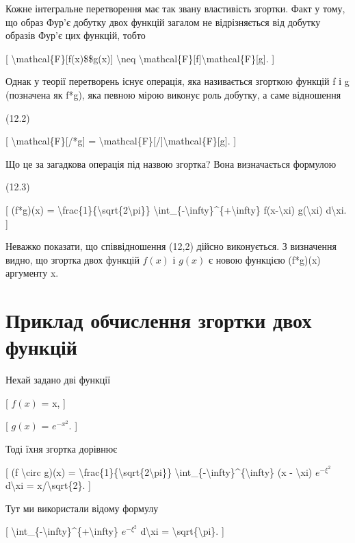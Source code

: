 \documentclass[
]{article}
\begin{document}
{{Кожне інтегральне перетворення має так звану властивість згортки. Факт у
тому, що образ Фур'є добутку двох функцій загалом не відрізняється від
добутку образів Фур'є цих функцій, тобто

{[} \textbackslash mathcal\{F\}{[}f(x)\$\$g(x){]} \textbackslash neq
\textbackslash mathcal\{F\}{[}f{]}\textbackslash mathcal\{F\}{[}g{]}.
{]}

Однак у теорії перетворень існує операція, яка називається згорткою
функцій f і g (позначена як f*g), яка певною мірою виконує роль добутку,
а саме відношення

(12.2)

{[} \textbackslash mathcal\{F\}{[}/*g{]} =
\textbackslash mathcal\{F\}{[}/{]}\textbackslash mathcal\{F\}{[}g{]}.
{]}

Що це за загадкова операція під назвою згортка? Вона визначається
формулою

(12.3)

{[} (f*g)(x) =
\textbackslash frac\{1\}\{\textbackslash sqrt\{2\textbackslash pi\}\}
\textbackslash int\_\{-\textbackslash infty\}\^{}\{+\textbackslash infty\}
f(x-\textbackslash xi) g(\textbackslash xi) d\textbackslash xi. {]}

Неважко показати, що співвідношення (12,2) дійсно виконується. З
визначення видно, що згортка двох функцій \(f(x)\) і \(g(x)\) є новою
функцією (f*g)(x) аргументу x.

\section{Приклад обчислення згортки двох
функцій}\label{ux43fux440ux438ux43aux43bux430ux434-ux43eux431ux447ux438ux441ux43bux435ux43dux43dux44f-ux437ux433ux43eux440ux442ux43aux438-ux434ux432ux43eux445-ux444ux443ux43dux43aux446ux456ux439}

Нехай задано дві функції

{[} \(f(x)\) = x, {]}

{[} \(g(x)\) = \(e^{-x^2}\). {]}

Тоді їхня згортка дорівнює

{[} (f \textbackslash circ g)(x) =
\textbackslash frac\{1\}\{\textbackslash sqrt\{2\textbackslash pi\}\}
\textbackslash int\_\{-\textbackslash infty\}\^{}\{\textbackslash infty\}
(x - \textbackslash xi) \(e^{-\xi^2}\) d\textbackslash xi =
x/\textbackslash sqrt\{2\}. {]}

Тут ми використали відому формулу

{[}
\textbackslash int\_\{-\textbackslash infty\}\^{}\{+\textbackslash infty\}
\(e^{-\xi^2}\) d\textbackslash xi =
\textbackslash sqrt\{\textbackslash pi\}. {]}

}}
\end{document}
